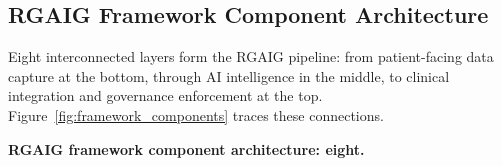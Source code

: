 \iffalse %
\subsection{RGAIG Framework Component Architecture}
\label{sec:framework_components}

Eight interconnected layers form the RGAIG pipeline: from patient-facing data capture at the bottom, through AI intelligence in the middle, to clinical integration and governance enforcement at the top. Figure~\ref{fig:framework_components} traces these connections.

\noindent\textbf{RGAIG framework component architecture: eight.}

